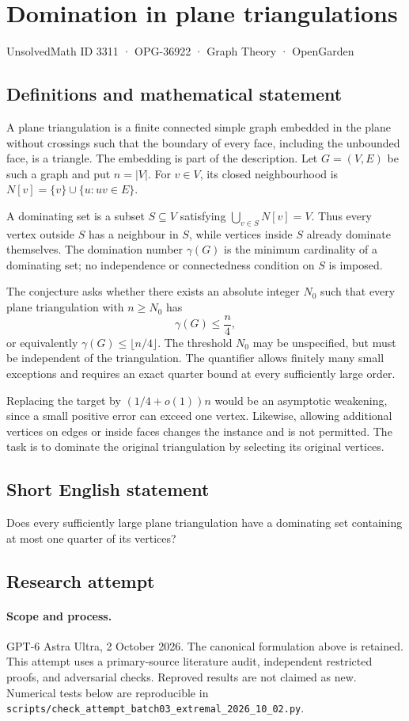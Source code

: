 \documentclass[11pt,a4paper]{article}
\begin{document}
\section*{Domination in plane triangulations}\label{3311}
{\small UnsolvedMath ID 3311 · OPG-36922 · Graph Theory · OpenGarden}
\subsection{Definitions and mathematical statement}
A plane triangulation is a finite connected simple graph embedded in
the plane without crossings such that the boundary of every face,
including the unbounded face, is a triangle. The embedding is part
of the description. Let $G=(V,E)$ be such a graph and put $n=|V|$.
For $v\in V$, its closed neighbourhood is
$N[v]=\{v\}\cup\{u:uv\in E\}$.

A dominating set is a subset $S\subseteq V$ satisfying
$\bigcup_{v\in S}N[v]=V$. Thus every vertex outside $S$ has a neighbour
in $S$, while vertices inside $S$ already dominate themselves.
The domination number $\gamma(G)$ is the minimum cardinality of a
dominating set; no independence or connectedness condition on $S$
is imposed.

The conjecture asks whether there exists an absolute integer $N_0$
such that every plane triangulation with $n\ge N_0$ has
\[
                             \gamma(G)\le\frac n4,
\]
or equivalently $\gamma(G)\le\lfloor n/4\rfloor$. The threshold $N_0$
may be unspecified, but must be independent of the triangulation.
The quantifier allows finitely many small exceptions and requires an
exact quarter bound at every sufficiently large order.

Replacing the target by $(1/4+o(1))n$ would be an asymptotic weakening,
since a small positive error can exceed one vertex. Likewise,
allowing additional vertices on edges or inside faces changes the
instance and is not permitted. The task is to dominate the original
triangulation by selecting its original vertices.
\subsection{Short English statement}
Does every sufficiently large plane triangulation have a dominating set containing at most one quarter of its vertices?
\subsection{Research attempt}
\paragraph{Scope and process.}
GPT-6 Astra Ultra, 2 October 2026. The canonical formulation above is retained. This attempt uses a primary-source literature audit, independent restricted proofs, and adversarial checks. Reproved results are not claimed as new. Numerical tests below are reproducible in \texttt{scripts/check\_attempt\_batch03\_extremal\_2026\_10\_02.py}.
\end{document}
